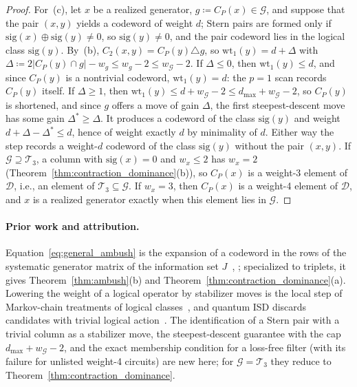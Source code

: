 \documentclass[12pt]{article}
\theoremstyle{definition}
\newcommand{\Dc}{\mathcal{D}}
\newcommand{\Tc}{\mathcal{T}_3}
\newcommand{\Gc}{\mathcal{G}}
\begin{document}
\begin{proof}
For~(c), let $x$ be a realized generator, $g \coloneqq C_P(x) \in \Gc$, and suppose that the pair $(x, y)$ yields a
codeword of weight $d$; Stern pairs are formed only if $\mathrm{sig}(x) \oplus \mathrm{sig}(y) \neq 0$, so
$\mathrm{sig}(y) \neq 0$, and the pair codeword lies in the logical class $\mathrm{sig}(y)$. By~(b), $C_2(x, y) =
C_P(y) \triangle g$, so $\mathrm{wt}_1(y) = d + \Delta$ with $\Delta \coloneqq 2|C_P(y) \cap g| - w_g \le w_g - 2 \le
w_{\Gc} - 2$. If $\Delta \le 0$, then $\mathrm{wt}_1(y) \le d$, and since $C_P(y)$ is a nontrivial codeword,
$\mathrm{wt}_1(y) = d$: the $p = 1$ scan records $C_P(y)$ itself. If $\Delta \ge 1$, then $\mathrm{wt}_1(y) \le d +
w_{\Gc} - 2 \le d_{\max} + w_{\Gc} - 2$, so $C_P(y)$ is shortened, and since $g$ offers a move of gain $\Delta$, the
first steepest-descent move has some gain $\Delta^* \ge \Delta$. It produces a codeword of the class $\mathrm{sig}(y)$
and weight $d + \Delta - \Delta^* \le d$, hence of weight exactly $d$ by minimality of $d$. Either way the step
records a weight-$d$ codeword of the class $\mathrm{sig}(y)$ without the pair $(x, y)$. If $\Gc \supseteq \Tc$, a
column with $\mathrm{sig}(x) = 0$ and $w_x \le 2$ has $w_x = 2$ (Theorem~\ref{thm:contraction_dominance}(b)), so
$C_P(x)$ is a weight-3 element of $\Dc$, i.e., an element of $\Tc \subseteq \Gc$. If $w_x = 3$, then $C_P(x)$ is a
weight-4 element of $\Dc$, and $x$ is a realized generator exactly when this element lies in $\Gc$.
\end{proof}

\paragraph{Prior work and attribution.}
Equation~\eqref{eq:general_ambush} is the expansion of a codeword in the rows of the systematic generator matrix of
the information set $J$~\cite{Prange1962,MacWilliamsSloane1977}, \cite[Cor.~1.2.6]{Oxley2011}; specialized to
triplets, it gives Theorem~\ref{thm:ambush}(b) and Theorem~\ref{thm:contraction_dominance}(a). Lowering the weight of
a logical operator by stabilizer moves is the local step of Markov-chain treatments of logical
classes~\cite{WoottonLoss2012,HutterWoottonLoss2014}, and quantum ISD discards candidates with trivial logical
action~\cite{PryadkoShabashovKozin2022QDistRnd}. The identification of a Stern pair with a trivial column as a
stabilizer move, the steepest-descent guarantee with the cap $d_{\max} + w_{\Gc} - 2$, and the exact membership
condition for a loss-free filter (with its failure for unlisted weight-4 circuits) are new here; for $\Gc = \Tc$ they
reduce to Theorem~\ref{thm:contraction_dominance}.
\end{document}
